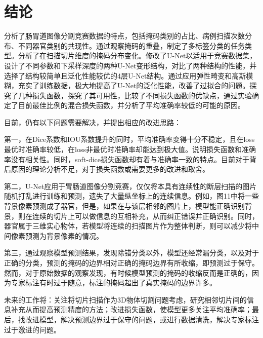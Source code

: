 \documentclass[letterpaper, 10pt, conference, twoside]{ieeeconf}
\begin{document}
\section{结论}

分析了肠胃道图像分割竞赛数据的特点，包括掩码类别的占比、病例扫描次数分布、不同器官类别的共现性。通过观察掩码的重叠，制定了多标签分类的任务类型。分析了在扫描切片维度的掩码分布变化。修改了U-Net以适用于竞赛数据集，设计了不同参数和下采样深度的两种U-Net变形结构，对比了两种结构的性能，并选择了结构较简单且泛化性能较优的4层U-Net结构。通过应用弹性畸变和高斯模糊，充实了训练数据，极大地提高了U-Net的泛化性能，改善了过拟合的问题。探究了几种损失函数，探究了其可用性，比较了不同损失函数的优缺点，通过实验确定了目前最佳比例的混合损失函数，并分析了平均准确率较低的可能的原因。

目前，仍有以下问题需要解决，并提出相应的改进思路：

第一，在Dice系数和IOU系数提升的同时，平均准确率变得十分不稳定，且在loss最优时准确率较低，在loss非最优时准确率却能达到极大值。说明损失函数和准确率没有相关性。同时，soft-dice损失函数却有着与准确率一致的特点。目前对于背后原因的理论分析不足，对于损失函数或需要更多的改进和取舍。

第二，U-Net应用于胃肠道图像分割竞赛，仅仅将本具有连续性的断层扫描的图片随机打乱进行训练和预测，遗失了大量纵坐标上的连续信息。例如，图11中将一些背景像素预测成了器官，但是，如果在与该层相邻的图片上，模型能正确识别背景，则在连续的切片上可以做信息的互相补充，从而纠正错误并正确识别。同时，器官属于三维实心物体，若模型将连续的扫描图片作为整体判断，则可以减少将中间像素预测为背景像素的情况。

第三，通过观察模型预测结果，发现除错分类以外，模型还经常漏分类，以及对于正确的分类，预测的掩码的边界相对正确的掩码边界有所收缩，即预测过于保守。然而，对于原始数据的观察发现，有时候模型预测的掩码的收缩反而是正确的，因为专家标注有时过于随意，标注的掩码超出了真实掩码的边界许多。

未来的工作将：关注将切片扫描作为3D物体切割问题考虑，研究相邻切片间的信息补充从而提高预测精度的方法；改进损失函数，使模型更多关注平均准确率；最后，找改进模型，解决预测边界过于保守的问题，或进行数据清洗，解决专家标注过于激进的问题。
\end{document}
